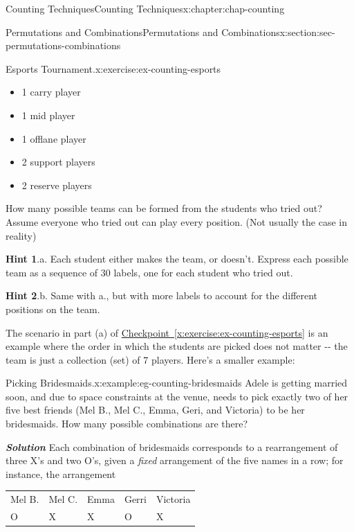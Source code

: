 \documentclass[oneside,10pt,]{book}
\newcommand{\blocktitlefont}{\relax}
\newcommand{\tabularfont}{\relax}
\newcommand{\xreffont}{\relax}
\newcommand{\alert}[1]{\textbf{\textit{#1}}}
\numberwithin{equation}{section}
\begin{document}
\begin{chapterptx}{Counting Techniques}{}{Counting Techniques}{}{}{x:chapter:chap-counting}
\begin{sectionptx}{Permutations and Combinations}{}{Permutations and Combinations}{}{}{x:section:sec-permutations-combinations}
\begin{inlineexercise}{Esports Tournament.}{x:exercise:ex-counting-esports}
\begin{enumerate}[label=(\alph*)]
\begin{itemize}[label=\textbullet]
\item{}1 carry player%
\item{}1 mid player%
\item{}1 offlane player%
\item{}2 support players%
\item{}2 reserve players%
\end{itemize}
How many possible teams can be formed from the students who tried out? Assume everyone who tried out can play every position. (Not usually the case in reality\textellipsis{})%
\end{enumerate}
%
\par\smallskip%
\noindent\textbf{\blocktitlefont Hint 1}.\hypertarget{g:hint:id472767}{}\quad{}a. Each student either makes the team, or doesn't. Express each possible team as a sequence of 30 labels, one for each student who tried out.%
\par\smallskip%
\noindent\textbf{\blocktitlefont Hint 2}.\hypertarget{g:hint:id472756}{}\quad{}b. Same with a., but with more labels to account for the different positions on the team.%
\end{inlineexercise}
The scenario in part (a) of \hyperref[x:exercise:ex-counting-esports]{Checkpoint~{\xreffont\ref{x:exercise:ex-counting-esports}}} is an example where the order in which the students are picked does not matter -{}-{} the team is just a collection (set) of 7 players. Here's a smaller example:%
\begin{example}{Picking Bridesmaids.}{x:example:eg-counting-bridesmaids}%
Adele is getting married soon, and due to space constraints at the venue, needs to pick exactly two of her five best friends (Mel B., Mel C., Emma, Geri, and Victoria) to be her bridesmaids. How many possible combinations are there?%
\par
\alert{Solution} Each combination of bridesmaids corresponds to a rearrangement of three X's and two O's, given a \emph{fixed} arrangement of the five names in a row; for instance, the arrangement%
\begin{sidebyside}{1}{0.225}{0.225}{0}%
\begin{sbspanel}{0.55}%
{\centering%
{\tabularfont%
\begin{tabular}{lllll}
Mel B.&Mel C.&Emma&Gerri&Victoria\tabularnewline[0pt]
O&X&X&O&X
\end{tabular}
}%
\par}
\end{sbspanel}%
\end{sidebyside}%
\par

\end{example}
\end{sectionptx}
\end{chapterptx}
\end{document}
